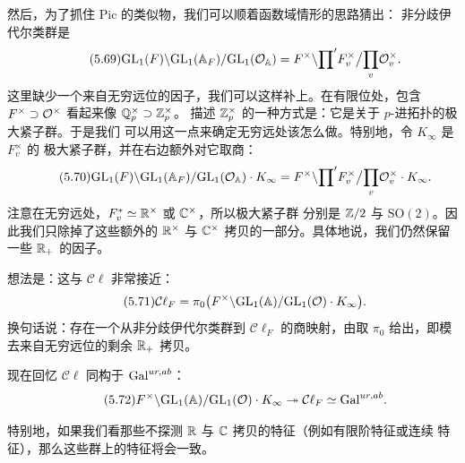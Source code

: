 然后，为了抓住 $\mathrm{Pic}$ 的类似物，我们可以顺着函数域情形的思路猜出：
非分歧伊代尔类群是
\begin{equation}\tag{5.69}
\mathrm{GL}_{1}(F)\backslash\mathrm{GL}_{1}(\mathbb{A}_{F})/\mathrm{GL}_{1}(\mathcal{O}_{\mathbb{A}})
=F^{\times}\backslash{\prod}'F_{v}^{\times}\big/{\prod_{v}}\mathcal{O}_{v}^{\times}.
\end{equation}
这里缺少一个来自无穷远位的因子，我们可以这样补上。在有限位处，包含
$F^{\times}\supset\mathcal{O}^{\times}$ 看起来像 $\mathbb{Q}_{p}^{\times}\supset\mathbb{Z}_{p}^{\times}$。
描述 $\mathbb{Z}_{p}^{\times}$ 的一种方式是：它是关于 $p$-进拓扑的极大紧子群。于是我们
可以用这一点来确定无穷远处该怎么做。特别地，令 $K_{\infty}$ 是 $F_{v}^{\times}$ 的
极大紧子群，并在右边额外对它取商：
\begin{equation}\tag{5.70}
\mathrm{GL}_{1}(F)\backslash\mathrm{GL}_{1}(\mathbb{A}_{F})/\mathrm{GL}_{1}(\mathcal{O}_{\mathbb{A}})\cdot K_{\infty}
=F^{\times}\backslash{\prod}'F_{v}^{\times}\big/{\prod_{v}}\mathcal{O}_{v}^{\times}\cdot K_{\infty}.
\end{equation}
注意在无穷远处，$F_{v}^{*}\simeq\mathbb{R}^{\times}$ 或 $\mathbb{C}^{\times}$，所以极大紧子群
分别是 $\mathbb{Z}/2$ 与 $\mathrm{SO}(2)$。因此我们只除掉了这些额外的 $\mathbb{R}^{\times}$ 与
$\mathbb{C}^{\times}$ 拷贝的一部分。具体地说，我们仍然保留一些 $\mathbb{R}_{+}$ 的因子。

想法是：这与 $\mathcal{C}\ell$ 非常接近：
\begin{equation}\tag{5.71}
\mathcal{C}\ell_{F}=\pi_{0}\bigl(F^{\times}\backslash\mathrm{GL}_{1}(\mathbb{A})/\mathrm{GL}_{1}(\mathcal{O})\cdot K_{\infty}\bigr).
\end{equation}
换句话说：存在一个从非分歧伊代尔类群到 $\mathcal{C}\ell_{F}$ 的商映射，由取
$\pi_{0}$ 给出，即模去来自无穷远位的剩余 $\mathbb{R}_{+}$ 拷贝。

现在回忆 $\mathcal{C}\ell$ 同构于 $\mathrm{Gal}^{ur,ab}$：
\begin{equation}\tag{5.72}
F^{\times}\backslash\mathrm{GL}_{1}(\mathbb{A})/\mathrm{GL}_{1}(\mathcal{O})\cdot K_{\infty}
\twoheadrightarrow\mathcal{C}\ell_{F}\simeq\mathrm{Gal}^{ur,ab}.
\end{equation}


特别地，如果我们看那些不探测 $\mathbb{R}$ 与 $\mathbb{C}$ 拷贝的特征（例如有限阶特征或连续
特征），那么这些群上的特征将会一致。

